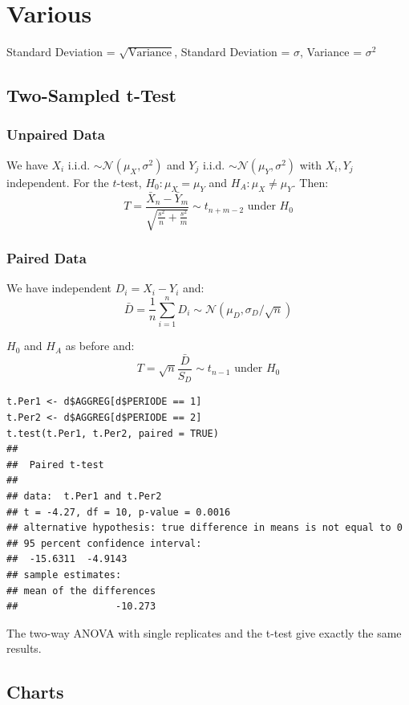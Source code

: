 \section{Various}


\begin{tcolorbox}
	Standard Deviation = $\sqrt{\text{Variance}}$, Standard Deviation = $\sigma$, Variance = $\sigma^2$
\end{tcolorbox}


\subsection{Two-Sampled t-Test}

\subsubsection{Unpaired Data}

We have $X_i$ i.i.d. $\sim \mathcal N(\mu_X, \sigma^2)$ and $Y_j$ i.i.d. $\sim \mathcal N(\mu_Y, \sigma^2)$ with $X_i, Y_j$ independent. For the $t$-test, $H_0: \mu_X = \mu_Y$ and $H_A: \mu_X \neq \mu_Y$. Then:
$$T = \frac{\bar X_n - \bar Y_m}{\sqrt{\frac{s^2}{n} + \frac{s^2}{m}}} \sim t_{n+m-2} \text{ under } H_0$$

\subsubsection{Paired Data}

We have independent $D_i = X_i - Y_i$ and:
$$\bar D = \frac{1}{n} \sum_{i=1}^n D_i \sim \mathcal N(\mu_D, \sigma_D / \sqrt{n})$$

$H_0$ and $H_A$ as before and:
$$T = \sqrt{n} \frac{\bar D}{S_D} \sim t_{n-1} \text{ under } H_0$$
\begin{lstlisting}
t.Per1 <- d$AGGREG[d$PERIODE == 1]
t.Per2 <- d$AGGREG[d$PERIODE == 2]
t.test(t.Per1, t.Per2, paired = TRUE)
##
##  Paired t-test
##
## data:  t.Per1 and t.Per2
## t = -4.27, df = 10, p-value = 0.0016
## alternative hypothesis: true difference in means is not equal to 0
## 95 percent confidence interval:
##  -15.6311  -4.9143
## sample estimates:
## mean of the differences
##                 -10.273
\end{lstlisting}
The two-way ANOVA with single replicates and the t-test give exactly the same results.

\subsection{Charts}

